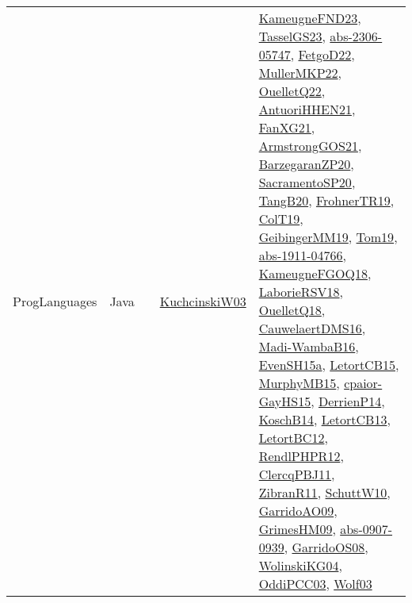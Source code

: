 {\begin{longtable}{lp{3cm}>{\raggedright}p{6cm}>{\raggedright}p{6cm}p{8cm}}
ProgLanguages & Java &  & \href{articles/KuchcinskiW03.pdf}{KuchcinskiW03}\cite{KuchcinskiW03} & \href{papers/KameugneFND23.pdf}{KameugneFND23}\cite{KameugneFND23}, \href{papers/TasselGS23.pdf}{TasselGS23}\cite{TasselGS23}, \href{articles/abs-2306-05747.pdf}{abs-2306-05747}\cite{abs-2306-05747}, \href{articles/FetgoD22.pdf}{FetgoD22}\cite{FetgoD22}, \href{articles/MullerMKP22.pdf}{MullerMKP22}\cite{MullerMKP22}, \href{papers/OuelletQ22.pdf}{OuelletQ22}\cite{OuelletQ22}, \href{papers/AntuoriHHEN21.pdf}{AntuoriHHEN21}\cite{AntuoriHHEN21}, \href{articles/FanXG21.pdf}{FanXG21}\cite{FanXG21}, \href{papers/ArmstrongGOS21.pdf}{ArmstrongGOS21}\cite{ArmstrongGOS21}, \href{papers/BarzegaranZP20.pdf}{BarzegaranZP20}\cite{BarzegaranZP20}, \href{articles/SacramentoSP20.pdf}{SacramentoSP20}\cite{SacramentoSP20}, \href{papers/TangB20.pdf}{TangB20}\cite{TangB20}, \href{papers/FrohnerTR19.pdf}{FrohnerTR19}\cite{FrohnerTR19}, \href{papers/ColT19.pdf}{ColT19}\cite{ColT19}, \href{papers/GeibingerMM19.pdf}{GeibingerMM19}\cite{GeibingerMM19}, \href{papers/Tom19.pdf}{Tom19}\cite{Tom19}, \href{articles/abs-1911-04766.pdf}{abs-1911-04766}\cite{abs-1911-04766}, \href{papers/KameugneFGOQ18.pdf}{KameugneFGOQ18}\cite{KameugneFGOQ18}, \href{articles/LaborieRSV18.pdf}{LaborieRSV18}\cite{LaborieRSV18}, \href{papers/OuelletQ18.pdf}{OuelletQ18}\cite{OuelletQ18}, \href{papers/CauwelaertDMS16.pdf}{CauwelaertDMS16}\cite{CauwelaertDMS16}, \href{papers/Madi-WambaB16.pdf}{Madi-WambaB16}\cite{Madi-WambaB16}, \href{articles/EvenSH15a.pdf}{EvenSH15a}\cite{EvenSH15a}, \href{articles/LetortCB15.pdf}{LetortCB15}\cite{LetortCB15}, \href{papers/MurphyMB15.pdf}{MurphyMB15}\cite{MurphyMB15}, \href{papers/cpaior-GayHS15.pdf}{cpaior-GayHS15}\cite{cpaior-GayHS15}, \href{papers/DerrienP14.pdf}{DerrienP14}\cite{DerrienP14}, \href{papers/KoschB14.pdf}{KoschB14}\cite{KoschB14}, \href{papers/LetortCB13.pdf}{LetortCB13}\cite{LetortCB13}, \href{papers/LetortBC12.pdf}{LetortBC12}\cite{LetortBC12}, \href{papers/RendlPHPR12.pdf}{RendlPHPR12}\cite{RendlPHPR12}, \href{papers/ClercqPBJ11.pdf}{ClercqPBJ11}\cite{ClercqPBJ11}, \href{papers/ZibranR11.pdf}{ZibranR11}\cite{ZibranR11}, \href{papers/SchuttW10.pdf}{SchuttW10}\cite{SchuttW10}, \href{articles/GarridoAO09.pdf}{GarridoAO09}\cite{GarridoAO09}, \href{papers/GrimesHM09.pdf}{GrimesHM09}\cite{GrimesHM09}, \href{articles/abs-0907-0939.pdf}{abs-0907-0939}\cite{abs-0907-0939}, \href{articles/GarridoOS08.pdf}{GarridoOS08}\cite{GarridoOS08}, \href{papers/WolinskiKG04.pdf}{WolinskiKG04}\cite{WolinskiKG04}, \href{papers/OddiPCC03.pdf}{OddiPCC03}\cite{OddiPCC03}, \href{papers/Wolf03.pdf}{Wolf03}\cite{Wolf03}\\

\end{longtable}}
